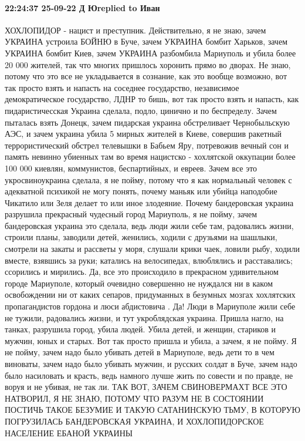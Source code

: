  
 
 
 
 

\paragraph{22:24:37 25-09-22 Д Юreplied to Иван}

ХОХЛОПИДОР - нацист и преступник. Действительно, я не знаю, зачем УКРАИНА
устроила БОЙНЮ в Буче, зачем УКРАИНА бомбит Харьков, зачем УКРАИНА бомбит Киев,
зачем УКРАИНА разбомбила Мариуполь и убила более 20 000 жителей, так что многих
пришлось хоронить прямо во дворах. Не знаю, потому что это все не укладывается
в сознание, как это вообще возможно, вот так просто взять и напасть на соседнее
государство, независимое демократическое государство, ЛДНР то бишь, вот так
просто взять и напасть, как пидаристичесская Украина сделала, подло, цинично и
по беспределу. Зачем пыталась взять Донецк, зачем пидарская украина
обстреливает Чернобыльскую АЭС, и зачем украина убила 5 мирных жителей в Киеве,
совершив ракетный террористический обстрел телевышки в Бабьем Яру, потревожив
вечный сон и память невинно убиенных там во время нацистско - хохлятской
оккупации более 100 000 киевлян, коммунистов, беспартийных, и евреев. Зачем все
это укросвиноукраина сделала, я не пойму, потому что я как нормальный человек с
адекватной психикой не могу понять, почему маньяк или убийца наподобие Чикатило
или Зеля делает то или иное злодеяние. Почему бандеровская украина разрушила
прекрасный чудесный город Мариуполь, я не пойму, зачем бандеровская украина это
сделала, ведь люди жили себе там, радовались жизни, строили планы, заводили
детей, женились, ходили с друзьями на шашлыки, смотрели на закаты и рассветы у
моря, слушали крики чаек, ловили рыбу, ходили вместе, взявшись за руки;
катались на велосипедах, влюблялись и расставались; ссорились и мирились. Да,
все это происходило в прекрасном удивительном городе Мариуполе, который
очевидно совершенно не нуждался ни в каком освобождении ни от каких сепаров,
придуманных в безумных мозгах хохлятских пропагандистов гордона и люси
абдистовича . Да! Люди в Мариуполе жили себе не тужили, радовались жизни, и тут
укроблядская украина. Пришла нагло, на танках, разрушила город, убила людей.
Убила детей, и женщин, стариков и мужчин, юных и старых. Вот так просто пришла
и убила, а зачем, я не пойму. Я не пойму, зачем надо было убивать детей в
Мариуполе, ведь дети то в чем виноваты, зачем надо было убивать мужчин, и
русских солдат в Буче, зачем надо было насиловать и красть, ведь намного лучше
жить по совести и по правде, не воруя и не убивая, не так ли. ТАК ВОТ, ЗАЧЕМ
СВИНОВЕРМАХТ ВСЕ ЭТО НАТВОРИЛ, Я НЕ ЗНАЮ, ПОТОМУ ЧТО РАЗУМ НЕ В СОСТОЯНИИ
ПОСТИЧЬ ТАКОЕ БЕЗУМИЕ И ТАКУЮ САТАНИНСКУЮ ТЬМУ, В КОТОРУЮ ПОГРУЗИЛАСЬ
БАНДЕРОВСКАЯ УКРАИНА, И ХОХЛОПИДОРСКОЕ НАСЕЛЕНИЕ ЕБАНОЙ УКРАИНЫ
